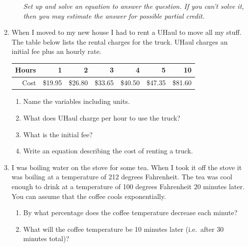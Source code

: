 \documentclass[12pt]{article}
\begin{document}
\begin{enumerate}
\begin{enumerate}
\emph{Set up and solve an equation to answer the question.  If you can't solve it, then you may estimate the answer for possible partial credit.}
\vfill
\vfill
\vfill
\end{enumerate}

\newpage %

\item When I moved to my new house I had to rent a UHaul to move all my stuff.  The table below lists the rental charges for the truck.  UHaul charges an initial fee plus an hourly rate.

\begin{center}
\begin{tabular} {|r|r|r|r|r|r|r|} \hline
Hours & 1 & 2 & 3 & 4 & 5 & 10 \\ \hline
Cost & \$19.95 & \$26.80 & \$33.65 & \$40.50 & \$47.35 & \$81.60 \\ \hline
\end{tabular}
\end{center}

\begin{enumerate}
\item Name the variables including units.
\vfill
\item What does UHaul charge per hour to use the truck?
\vfill
\item What is the initial fee?
\vfill
\item Write an equation describing the cost of renting a truck.
\vfill
\end{enumerate}

\newpage %

\item I was boiling water on the stove for some tea.  When I took it off the stove it was boiling at a temperature of 212 degrees Fahrenheit. The tea was cool enough to drink at a temperature of 100 degrees Fahrenheit 20 minutes later. You can assume that the coffee cools exponentially.

\begin{enumerate}
\item By what percentage does the coffee temperature decrease each minute?
\vfill
\item What will the coffee temperature be 10 minutes later (i.e.\ after 30 minutes total)?
\vfill
\end{enumerate}



\end{enumerate}
\end{document}
